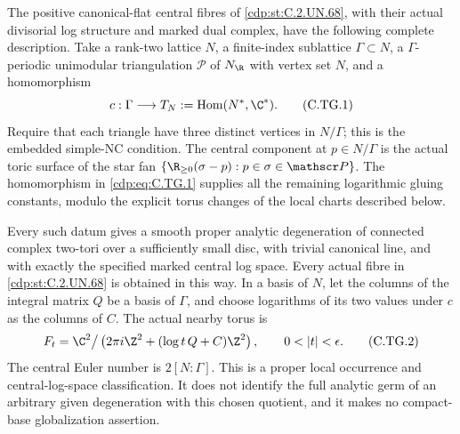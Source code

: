 
\begin{proposition}\label{cdp:st:C.2.UN.71}
The positive canonical-flat central fibres of \ref{cdp:st:C.2.UN.68},
with their actual divisorial log structure and marked
dual complex, have the following complete description.
Take a rank-two lattice $N$, a finite-index sublattice
$\Gamma\subset N$, a $\Gamma$-periodic unimodular
triangulation $\mathscr P$ of $N_{\R}$ with vertex set
$N$, and a homomorphism
\[
       c:\Gamma\longrightarrow T_N
          :=\operatorname{Hom}(N^*,\C^*).
\tag{C.TG.1}\label{cdp:eq:C.TG.1}
\]
Require that each triangle have three distinct vertices
in $N/\Gamma$; this is the embedded simple-NC condition.
The central component at $p\in N/\Gamma$ is the actual
toric surface of the star fan
$\{\R_{\ge0}(\sigma-p):p\in\sigma\in\mathscr P\}$.
The homomorphism in \eqref{cdp:eq:C.TG.1} supplies all the remaining
logarithmic gluing constants, modulo the explicit torus
changes of the local charts described below.

Every such datum gives a smooth proper analytic
degeneration of connected complex two-tori over a
sufficiently small disc, with trivial canonical line,
and with exactly the specified marked central log space.
Every actual fibre in \ref{cdp:st:C.2.UN.68} is obtained in this way.
In a basis of $N$, let the columns of the integral
matrix $Q$ be a basis of $\Gamma$, and choose logarithms
of its two values under $c$ as the columns of $C$.
The actual nearby torus is
\[
 F_t=\C^2\big/
       \left(2\pi i\Z^2+(\log t\,Q+C)\Z^2\right),
       \qquad 0<|t|<\epsilon .
\tag{C.TG.2}\label{cdp:eq:C.TG.2}
\]
The central Euler number is $2[N:\Gamma]$.
This is a proper local occurrence and central-log-space
classification. It does not identify the full analytic
germ of an arbitrary given degeneration with this
chosen quotient, and it makes no compact-base
globalization assertion.
\end{proposition}

